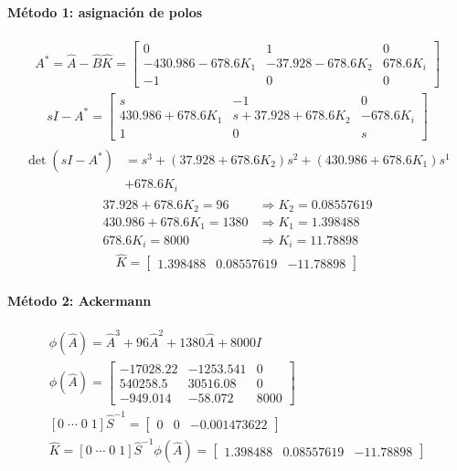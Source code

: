 \documentclass[11pt]{article}
\begin{document}
\paragraph{Método 1: asignación de polos}
\begin{gather*}
A^*=\hat A-\hat B\hat K=\begin{bmatrix}0&1&0\\-430.986-678.6K_1&-37.928-678.6K_2&678.6K_i\\-1&0&0\end{bmatrix}
\end{gather*}
\begin{gather*}
sI-A^*=\begin{bmatrix}s&-1&0\\430.986+678.6K_1&s+37.928+678.6K_2&-678.6K_i\\1&0&s\end{bmatrix}
\end{gather*}
\begin{gather*}
\begin{aligned}\det(sI-A^*)&=s^{3}+(37.928+678.6K_2)s^{2}+(430.986+678.6K_1)s^{1}\\&+678.6K_i\end{aligned}
\end{gather*}
\begin{align*}
37.928+678.6K_2=96&\Rightarrow K_2=0.08557619\\
430.986+678.6K_1=1380&\Rightarrow K_1=1.398488\\
678.6K_i=8000&\Rightarrow K_i=11.78898
\end{align*}
\begin{gather*}
\hat K=\begin{bmatrix}1.398488 & 0.08557619 & -11.78898\end{bmatrix}
\end{gather*}
\paragraph{Método 2: Ackermann}
\begin{gather*}
\phi(\hat A)=\hat A^{3} + 96\hat A^{2} + 1380\hat A + 8000I\\
\phi(\hat A)=\begin{bmatrix}-17028.22 & -1253.541 & 0 \\ 540258.5 & 30516.08 & 0 \\ -949.014 & -58.072 & 8000\end{bmatrix}\\
[0\;\cdots\;0\;1]\hat S^{-1}=\begin{bmatrix}0 & 0 & -0.001473622\end{bmatrix}\\
\hat K=[0\;\cdots\;0\;1]\hat S^{-1}\phi(\hat A)=\begin{bmatrix}1.398488 & 0.08557619 & -11.78898\end{bmatrix}
\end{gather*}
\end{document}
